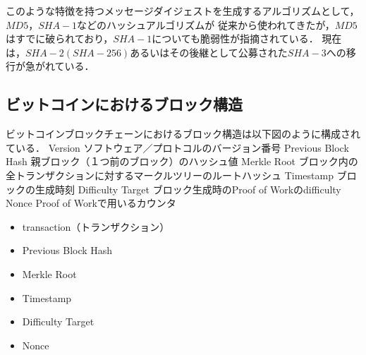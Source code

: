 \documentclass[a4paper,12pt]{jsarticle}
\begin{document}
このような特徴を持つメッセージダイジェストを生成するアルゴリズムとして，$MD5$，$SHA-1$などのハッシュアルゴリズムが
従来から使われてきたが，$MD5$はすでに破られており，$SHA-1$についても脆弱性が指摘されている．
現在は，$SHA-2(SHA-256)$あるいはその後継として公募された$SHA-3$への移行が急がれている．

\subsection*{ビットコインにおけるブロック構造}
ビットコインブロックチェーンにおけるブロック構造は以下図のように構成されている．
	Version	ソフトウェア／プロトコルのバージョン番号
	Previous Block Hash	親ブロック（１つ前のブロック）のハッシュ値
	Merkle Root	ブロック内の全トランザクションに対するマークルツリーのルートハッシュ
	Timestamp	ブロックの生成時刻
	Difficulty Target	ブロック生成時のProof of Workのdifficulty
	Nonce	Proof of Workで用いるカウンタ
\begin{itemize}
    \item transaction（トランザクション）
    \item Previous Block Hash
    \item Merkle Root
    \item Timestamp
    \item Difficulty Target
    \item Nonce
\end{itemize}
\end{document}
